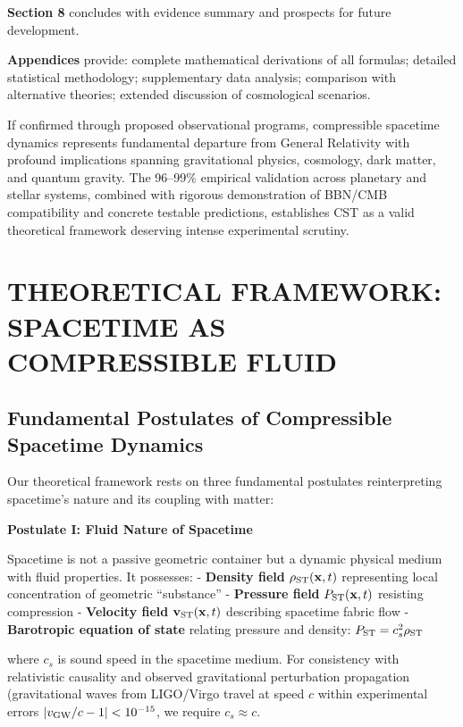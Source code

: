 \documentclass[10pt,a4paper]{article}
\begin{document}
\textbf{Section 8} concludes with evidence summary and prospects for
future development.

\textbf{Appendices} provide: complete mathematical derivations of all
formulas; detailed statistical methodology; supplementary data analysis;
comparison with alternative theories; extended discussion of
cosmological scenarios.

If confirmed through proposed observational programs, compressible
spacetime dynamics represents fundamental departure from General
Relativity with profound implications spanning gravitational physics,
cosmology, dark matter, and quantum gravity. The 96--99\% empirical
validation across planetary and stellar systems, combined with rigorous
demonstration of BBN/CMB compatibility and concrete testable
predictions, establishes CST as a valid theoretical framework deserving
intense experimental scrutiny.

\section{THEORETICAL FRAMEWORK: SPACETIME AS COMPRESSIBLE
FLUID}\label{theoretical-framework-spacetime-as-compressible-fluid}

\subsection{Fundamental Postulates of Compressible Spacetime
Dynamics}\label{fundamental-postulates-of-compressible-spacetime-dynamics}

Our theoretical framework rests on three fundamental postulates
reinterpreting spacetime's nature and its coupling with matter:

\textbf{Postulate I: Fluid Nature of Spacetime}

Spacetime is not a passive geometric container but a dynamic physical
medium with fluid properties. It possesses: - \textbf{Density field}
\(\rho_{\rm ST}({\bf x},t)\) representing local concentration of
geometric ``substance'' - \textbf{Pressure field}
\(P_{\rm ST}({\bf x},t)\) resisting compression - \textbf{Velocity
field} \({\bf v}_{\rm ST}({\bf x},t)\) describing spacetime fabric flow
- \textbf{Barotropic equation of state} relating pressure and density:
\(P_{\rm ST} = c_s^2 \rho_{\rm ST}\)

where \(c_s\) is sound speed in the spacetime medium. For consistency
with relativistic causality and observed gravitational perturbation
propagation (gravitational waves from LIGO/Virgo travel at speed \(c\)
within experimental errors \(|v_{\rm GW}/c - 1| < 10^{-15}\), we
require \(c_s \approx c\).
\end{document}
